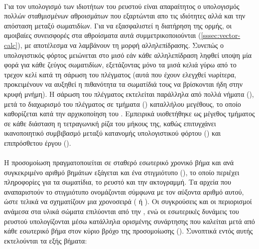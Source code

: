 \paragraph{} Για τον υπολογισμό των ιδιοτήτων του ρευστού είναι απαραίτητος ο υπολογισμός
πολλών σταθμισμένων αθροισμάτων που εξαρτώνται απο τις ιδιότητες αλλά και την απόσταση
μεταξύ σωματιδίων. Για να εξασφαλιστεί η διατήρηση της ορμής, οι αμοιβαίες συνεισφορές στα
αθροίσματα αυτά συμμετρικοποιούνται (\ref{sssec:vector-calc}), με αποτέλεσμα να λαμβάνουν
τη μορφή αλληλεπίδρασης. Συνεπώς ο υπολογιστικός φόρτος μειώνεται στο μισό εάν κάθε
αλληλεπίδραση ληφθεί υποψη μία φορά για κάθε ζεύγος σωματιδίων, εξετάζοντας μόνο τα μισά
κελιά γύρω από το τρεχον κελί κατά τη σάρωση του πλέγματος (αυτά που έχουν ελεγχθεί
νωρίτερα, προκειμένουν να αυξηθεί η πιθανότητα τα σωματίδιά τους να βρίσκονται ήδη στην
κρυφή μνήμη). H σάρωση του πλέγματος εκτελείται παράλληλα από πολλά νήματα
(), μετά το διαχωρισμό του πλέγματος σε τμήματα () καταλλήλου
μεγέθους, το οποίο καθορίζεται κατά την αρχικοποίηση του . Εμπειρικά
υιοθετήθηκε ως μέγεθος τμήματος σε κάθε διάσταση η τετραγωνική ρίζα του μήκους της, καθώς
επιτυγχάνει ικανοποιητικό συμβιβασμό μεταξύ κατανομής υπολογιστικού φόρτου () και επιπρόσθετου έργου ().

\paragraph{} Η προσομοίωση πραγματοποιείται σε σταθερό εσωτερικό χρονικό βήμα και ανά
συγκεκριμένο αριθμό βημάτων εξάγεται και ένα στιγμιότυπο (), το οποίο περιέχει
πληροφορίες για τα σωματίδια, το ρευστό και την ακτογραμμή. Τα αρχεία  που
αναπαριστούν το στιγμιότυπο ονομάζονται σύμφωνα με τον αύξοντα αριθμό αυτού, ώστε τελικά
να σχηματίζουν μια χρονοσειρά ( ή ). Οι συγκρούσεις και οι
περιορισμοί ανάμεσα στα υλικά σώματα επιλύονται από την , ενώ οι εσωτερικές
δυνάμεις του ρευστού υπολογίζονται μέσω κατάλληλα ορισμένης συνάρτησης που καλείται μετά
από κάθε εσωτερικό βήμα στον κύριο βρόχο της προσομοίωσης (). Συνοπτικά
εντός αυτής εκτελούνται τα εξής βήματα:

